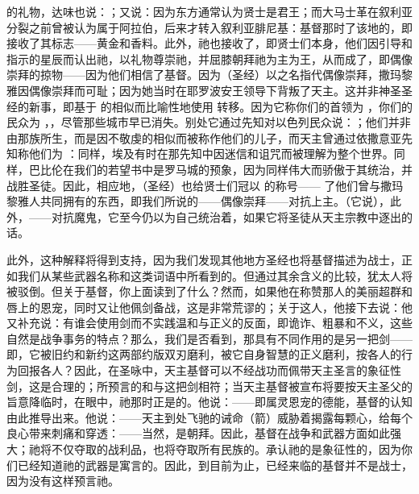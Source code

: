 的礼物，达味也说：；又说：因为东方通常认为贤士是君王；而大马士革在叙利亚分裂之前曾被认为属于阿拉伯，后来才转入叙利亚腓尼基：基督那时了该地的，即接收了其标志——黄金和香料。此外，祂也接收了，即贤士们本身，他们因引导和指示的星辰而认出祂，以礼物尊崇祂，并屈膝朝拜祂为主为王，从而成了，即偶像崇拜的掠物——因为他们相信了基督。因为（圣经）以之名指代偶像崇拜，撒玛黎雅因偶像崇拜而可耻；因为她当时在耶罗波安王领导下背叛了天主。这并非神圣圣经的新事，即基于  的相似而比喻性地使用  转移。因为它称你们的首领为 ，你们的民众为 ，，尽管那些城市早已消失。别处它通过先知对以色列民众说：；他们并非由那族所生，而是因不敬虔的相似而被称作他们的儿子，而天主曾通过依撒意亚先知称他们为 ：同样，埃及有时在那先知中因迷信和诅咒而被理解为整个世界。同样，巴比伦在我们的若望书中是罗马城的预象，因为同样伟大而骄傲于其统治，并战胜圣徒。因此，相应地，（圣经）也给贤士们冠以  的称号——  了他们曾与撒玛黎雅人共同拥有的东西，即我们所说的——偶像崇拜——对抗上主。（它说），此外，——对抗魔鬼，它至今仍以为自己统治着，如果它将圣徒从天主宗教中逐出的话。\par

此外，这种解释将得到支持，因为我们发现其他地方圣经也将基督描述为战士，正如我们从某些武器名称和这类词语中所看到的。但通过其余含义的比较，犹太人将被驳倒。但关于基督，你上面读到了什么？然而，如果他在称赞那人的美丽超群和唇上的恩宠，同时又让他佩剑备战，这是非常荒谬的；关于这人，他接下去说：他又补充说：有谁会使用剑而不实践温和与正义的反面，即诡诈、粗暴和不义，这些自然是战争事务的特点？那么，我们是否看到，那具有不同作用的是另一把剑——即，它被旧约和新约这两部约版双刃磨利，被它自身智慧的正义磨利，按各人的行为回报各人？因此，在圣咏中，天主基督可以不经战功而佩带天主圣言的象征性剑，这是合理的；所预言的和与这把剑相符；当天主基督被宣布将要按天主圣父的旨意降临时，在眼中，祂那时正是的。他说：——即属灵恩宠的德能，基督的认知由此推导出来。他说：——天主到处飞驰的诫命（箭）威胁着揭露每颗心，给每个良心带来刺痛和穿透：——当然，是朝拜。因此，基督在战争和武器方面如此强大；祂将不仅夺取的战利品，也将夺取所有民族的。承认祂的是象征性的，因为你们已经知道祂的武器是寓言的。因此，到目前为止，已经来临的基督并不是战士，因为没有这样预言祂。\par

